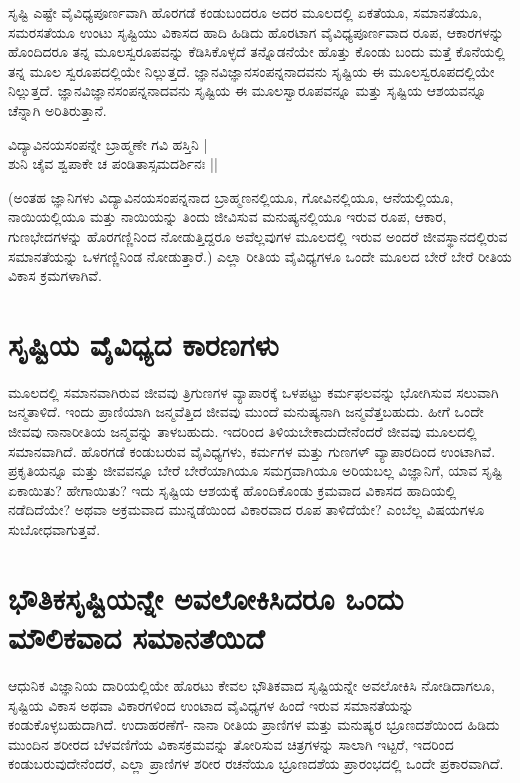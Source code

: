 ಸೃಷ್ಟಿ ಎಷ್ಟೇ ವೈವಿಧ್ಯಪೂರ್ಣವಾಗಿ ಹೊರಗಡೆ ಕಂಡುಬಂದರೂ ಅದರ ಮೂಲದಲ್ಲಿ ಏಕತೆಯೂ, ಸಮಾನತೆಯೂ, ಸಮರಸತೆಯೂ ಉಂಟು ಸೃಷ್ಟಿಯು ವಿಕಾಸದ ಹಾದಿ ಹಿಡಿದು ಹೊರಟಾಗ ವೈವಿಧ್ಯಪೂರ್ಣವಾದ ರೂಪ, ಆಕಾರಗಳನ್ನು ಹೊಂದಿದರೂ ತನ್ನ ಮೂಲಸ್ವರೂಪವನ್ನು ಕೆಡಿಸಿಕೊಳ್ಳದೆ ತನ್ನೊಡನೆಯೇ ಹೊತ್ತು ಕೊಂಡು ಬಂದು ಮತ್ತೆ ಕೊನೆಯಲ್ಲಿ ತನ್ನ ಮೂಲ ಸ್ವರೂಪದಲ್ಲಿಯೇ ನಿಲ್ಲುತ್ತದೆ. ಜ್ಞಾನವಿಜ್ಞಾನಸಂಪನ್ನನಾದವನು ಸೃಷ್ಟಿಯ ಈ ಮೂಲಸ್ವರೂಪದಲ್ಲಿಯೇ ನಿಲ್ಲುತ್ತದೆ. ಜ್ಞಾನವಿಜ್ಞಾನಸಂಪನ್ನನಾದವನು ಸೃಷ್ಟಿಯ ಈ ಮೂಲಸ್ವಾರೂಪವನ್ನೂ ಮತ್ತು ಸೃಷ್ಟಿಯ ಆಶಯವನ್ನೂ ಚೆನ್ನಾಗಿ ಅರಿತಿರುತ್ತಾನೆ.

\begin{shloka}
ವಿದ್ಯಾವಿನಯಸಂಪನ್ನೇ ಬ್ರಾಹ್ಮಣೇ ಗವಿ ಹಸ್ತಿನಿ |\\
ಶುನಿ ಚೈವ ಶ್ವಪಾಕೇ ಚ ಪಂಡಿತಾಸ್ಸಮದರ್ಶಿನಃ ||
\end{shloka}

(ಅಂತಹ ಜ್ಞಾನಿಗಳು ವಿದ್ಯಾವಿನಯಸಂಪನ್ನನಾದ ಬ್ರಾಹ್ಮಣನಲ್ಲಿಯೂ, ಗೋವಿನಲ್ಲಿಯೂ, ಆನೆಯಲ್ಲಿಯೂ, ನಾಯಿಯಲ್ಲಿಯೂ ಮತ್ತು ನಾಯಿಯನ್ನು ತಿಂದು ಜೀವಿಸುವ ಮನುಷ್ಯನಲ್ಲಿಯೂ ಇರುವ ರೂಪ, ಆಕಾರ, ಗುಣಭೇದಗಳನ್ನು ಹೊರಗಣ್ಣಿನಿಂದ ನೋಡುತ್ತಿದ್ದರೂ ಅವೆಲ್ಲವುಗಳ ಮೂಲದಲ್ಲಿ ಇರುವ ಅಂದರೆ ಜೀವಸ್ಥಾನದಲ್ಲಿರುವ ಸಮಾನತೆಯನ್ನು ಒಳಗಣ್ಣಿನಿಂಡ ನೋಡುತ್ತಾರೆ.) ಎಲ್ಲಾ ರೀತಿಯ ವೈವಿಧ್ಯಗಳೂ ಒಂದೇ ಮೂಲದ ಬೇರೆ ಬೇರೆ ರೀತಿಯ ವಿಕಾಸ ಕ್ರಮಗಳಾಗಿವೆ.

\section*{ಸೃಷ್ಟಿಯ ವೈವಿಧ್ಯದ ಕಾರಣಗಳು}

ಮೂಲದಲ್ಲಿ ಸಮಾನವಾಗಿರುವ ಜೀವವು ತ್ರಿಗುಣಗಳ ವ್ಯಾಪಾರಕ್ಕೆ ಒಳಪಟ್ಟು ಕರ್ಮಫಲವನ್ನು ಭೋಗಿಸುವ ಸಲುವಾಗಿ ಜನ್ಮತಾಳಿದೆ. ಇಂದು ಪ್ರಾಣಿಯಾಗಿ ಜನ್ಮವೆತ್ತಿದ ಜೀವವು ಮುಂದೆ ಮನುಷ್ಯನಾಗಿ ಜನ್ಮವೆತ್ತಬಹುದು. ಹೀಗೆ ಒಂದೇ ಜೀವವು ನಾನಾರೀತಿಯ ಜನ್ಮವನ್ನು ತಾಳಬಹುದು. ಇದರಿಂದ ತಿಳಿಯಬೇಕಾದುದೇನೆಂದರೆ ಜೀವವು ಮೂಲದಲ್ಲಿ ಸಮಾನವಾಗಿದೆ. ಹೊರಗಡೆ ಕಂಡುಬರುವ ವೈವಿಧ್ಯಗಳು, ಕರ್ಮಗಳ ಮತ್ತು ಗುಣಗಳ್ ವ್ಯಾಪಾರದಿಂದ ಉಂಟಾಗಿವೆ. ಪ್ರಕೃತಿಯನ್ನೂ ಮತ್ತು ಜೀವವನ್ನೂ ಬೇರೆ ಬೇರೆಯಾಗಿಯೂ ಸಮಗ್ರವಾಗಿಯೂ ಅರಿಯಬಲ್ಲ ವಿಜ್ಞಾನಿಗೆ, ಯಾವ ಸೃಷ್ಟಿ ಏಕಾಯಿತು? ಹೇಗಾಯಿತು? ಇದು ಸೃಷ್ಟಿಯ ಆಶಯಕ್ಕೆ ಹೊಂದಿಕೊಂಡು ಕ್ರಮವಾದ ವಿಕಾಸದ ಹಾದಿಯಲ್ಲಿ ನಡೆದಿದೆಯೇ? ಅಥವಾ ಅಕ್ರಮವಾದ ಮುನ್ನಡೆಯಿಂದ ವಿಕಾರವಾದ ರೂಪ ತಾಳಿದೆಯೇ? ಎಂಬೆಲ್ಲ ವಿಷಯಗಳೂ ಸುಬೋಧವಾಗುತ್ತವೆ.

\section*{ಭೌತಿಕಸೃಷ್ಟಿಯನ್ನೇ ಅವಲೋಕಿಸಿದರೂ ಒಂದು ಮೌಲಿಕವಾದ ಸಮಾನತೆಯಿದೆ}

ಆಧುನಿಕ ವಿಜ್ಞಾನಿಯ ದಾರಿಯಲ್ಲಿಯೇ ಹೊರಟು ಕೇವಲ ಭೌತಿಕವಾದ ಸೃಷ್ಟಿಯನ್ನೇ ಅವಲೋಕಿಸಿ ನೋಡಿದಾಗಲೂ, ಸೃಷ್ಟಿಯ ವಿಕಾಸ ಅಥವಾ ವಿಕಾರಗಳಿಂದ ಉಂಟಾದ ವೈವಿಧ್ಯಗಳ ಹಿಂದೆ ಇರುವ ಸಮಾನತೆಯನ್ನು ಕಂಡುಕೊಳ್ಳಬಹುದಾಗಿದೆ. ಉದಾಹರಣೆಗೆ- ನಾನಾ ರೀತಿಯ ಪ್ರಾಣಿಗಳ ಮತ್ತು ಮನುಷ್ಯರ ಭ್ರೂಣದಶೆಯಿಂದ ಹಿಡಿದು ಮುಂದಿನ ಶರೀರದ ಬೆಳವಣಿಗೆಯ ವಿಕಾಸಕ್ರಮವನ್ನು ತೋರಿಸುವ ಚಿತ್ರಗಳನ್ನು ಸಾಲಾಗಿ ಇಟ್ಟರೆ, ಇದರಿಂದ ಕಂಡುಬರುವುದೇನೆಂದರೆ, ಎಲ್ಲಾ ಪ್ರಾಣಿಗಳ ಶರೀರ ರಚನೆಯೂ ಭ್ರೂಣದಶೆಯ ಪ್ರಾರಂಭದಲ್ಲಿ ಒಂದೇ ಪ್ರಕಾರವಾಗಿದೆ.

